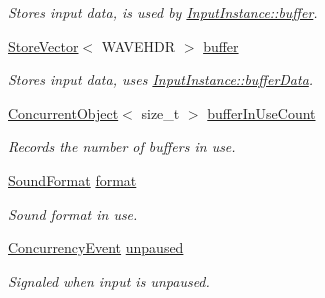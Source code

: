 \begin{DoxyCompactItemize}
\begin{DoxyCompactList}\small\item\em Stores input data, is used by \hyperlink{class_input_instance_aec0cf6441e90723068dcf9dcd97b2593}{InputInstance::buffer}. \item\end{DoxyCompactList}\item 
\hypertarget{class_input_instance_aec0cf6441e90723068dcf9dcd97b2593}{
\hyperlink{class_store_vector}{StoreVector}$<$ WAVEHDR $>$ \hyperlink{class_input_instance_aec0cf6441e90723068dcf9dcd97b2593}{buffer}}
\label{class_input_instance_aec0cf6441e90723068dcf9dcd97b2593}

\begin{DoxyCompactList}\small\item\em Stores input data, uses \hyperlink{class_input_instance_a90450a716bb744188724ee6d8e2d49cc}{InputInstance::bufferData}. \item\end{DoxyCompactList}\item 
\hyperlink{class_concurrent_object}{ConcurrentObject}$<$ size\_\-t $>$ \hyperlink{class_input_instance_a86c60cacc106703f53da51356d7aca80}{bufferInUseCount}
\begin{DoxyCompactList}\small\item\em Records the number of buffers in use. \item\end{DoxyCompactList}\item 
\hypertarget{class_input_instance_ac59241416a2e8e57c2d29e450ec071b8}{
\hyperlink{class_sound_format}{SoundFormat} \hyperlink{class_input_instance_ac59241416a2e8e57c2d29e450ec071b8}{format}}
\label{class_input_instance_ac59241416a2e8e57c2d29e450ec071b8}

\begin{DoxyCompactList}\small\item\em Sound format in use. \item\end{DoxyCompactList}\item 
\hypertarget{class_input_instance_add83233aa094306a96dfdc6ddf5625a6}{
\hyperlink{class_concurrency_event}{ConcurrencyEvent} \hyperlink{class_input_instance_add83233aa094306a96dfdc6ddf5625a6}{unpaused}}
\label{class_input_instance_add83233aa094306a96dfdc6ddf5625a6}

\begin{DoxyCompactList}\small\item\em Signaled when input is unpaused. \item\end{DoxyCompactList}\end{DoxyCompactItemize}


